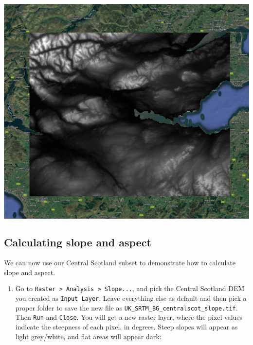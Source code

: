 \documentclass[
  letterpaper,
  DIV=11,
  numbers=noendperiod]{scrreprt}
\providecommand{\tightlist}{%
  \setlength{\itemsep}{0pt}\setlength{\parskip}{0pt}}\usepackage{longtable,booktabs,array}
\begin{document}
\includegraphics{images/lab_5/lab5_fig5_centralscot.jpg}

\subsection{Calculating slope and
aspect}\label{calculating-slope-and-aspect}

We can now use our Central Scotland subset to demonstrate how to
calculate slope and aspect.

\begin{enumerate}
\def\labelenumi{(\arabic{enumi})}
\setcounter{enumi}{149}
\tightlist
\item
  Go to
  \texttt{Raster\ \textgreater{}\ Analysis\ \textgreater{}\ Slope...},
  and pick the Central Scotland DEM you created as
  \texttt{Input\ Layer}. Leave everything else as default and then pick
  a proper folder to save the new file as
  \texttt{UK\_SRTM\_BG\_centralscot\_slope.tif}. Then \texttt{Run} and
  \texttt{Close}. You will get a new raster layer, where the pixel
  values indicate the steepness of each pixel, in degrees. Steep slopes
  will appear as light grey/white, and flat areas will appear dark:
\end{enumerate}
\end{document}

